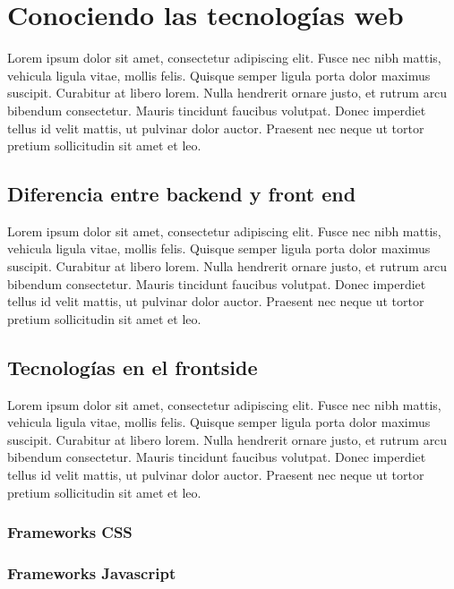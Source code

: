 \chapter{Conociendo las tecnologías web}\label{ch:chapter2}

Lorem ipsum dolor sit amet, consectetur adipiscing elit. Fusce nec nibh mattis, vehicula ligula vitae, mollis felis. Quisque semper ligula porta dolor maximus suscipit. Curabitur at libero lorem. Nulla hendrerit ornare justo, et rutrum arcu bibendum consectetur. Mauris tincidunt faucibus volutpat. Donec imperdiet tellus id velit mattis, ut pulvinar dolor auctor. Praesent nec neque ut tortor pretium sollicitudin sit amet et leo.

\section{Diferencia entre backend y front end}

Lorem ipsum dolor sit amet, consectetur adipiscing elit. Fusce nec nibh mattis, vehicula ligula vitae, mollis felis. Quisque semper ligula porta dolor maximus suscipit. Curabitur at libero lorem. Nulla hendrerit ornare justo, et rutrum arcu bibendum consectetur. Mauris tincidunt faucibus volutpat. Donec imperdiet tellus id velit mattis, ut pulvinar dolor auctor. Praesent nec neque ut tortor pretium sollicitudin sit amet et leo.

\section{Tecnologías en el frontside}

Lorem ipsum dolor sit amet, consectetur adipiscing elit. Fusce nec nibh mattis, vehicula ligula vitae, mollis felis. Quisque semper ligula porta dolor maximus suscipit. Curabitur at libero lorem. Nulla hendrerit ornare justo, et rutrum arcu bibendum consectetur. Mauris tincidunt faucibus volutpat. Donec imperdiet tellus id velit mattis, ut pulvinar dolor auctor. Praesent nec neque ut tortor pretium sollicitudin sit amet et leo.

\subsection{Frameworks CSS}

\subsection{Frameworks Javascript}

